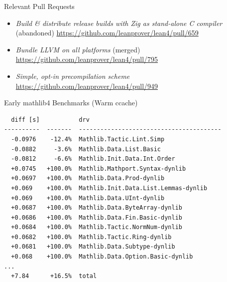 \documentclass[en,t,navbarkit]{sdqbeamer}
\begin{document}
\begin{frame}{Relevant Pull Requests}
  \begin{itemize}
    \item \emph{Build \& distribute release builds with Zig as stand-alone C compiler} (abandoned) \url{https://github.com/leanprover/lean4/pull/659}
    \item \emph{Bundle LLVM on all platforms} (merged)\\ \url{https://github.com/leanprover/lean4/pull/795}
    \item \emph{Simple, opt-in precompilation scheme}\\ \url{https://github.com/leanprover/lean4/pull/949}
  \end{itemize}
\end{frame}

\begin{frame}[fragile]{Early mathlib4 Benchmarks (Warm ccache)}
  \small
\begin{verbatim}
  diff [s]           drv
----------  -------  ----------------------------------------
  -0.0976    -12.4%  Mathlib.Tactic.Lint.Simp
  -0.0882     -3.6%  Mathlib.Data.List.Basic
  -0.0812     -6.6%  Mathlib.Init.Data.Int.Order
  +0.0745   +100.0%  Mathlib.Mathport.Syntax-dynlib
  +0.0697   +100.0%  Mathlib.Data.Prod-dynlib
  +0.069    +100.0%  Mathlib.Init.Data.List.Lemmas-dynlib
  +0.069    +100.0%  Mathlib.Data.UInt-dynlib
  +0.0687   +100.0%  Mathlib.Data.ByteArray-dynlib
  +0.0686   +100.0%  Mathlib.Data.Fin.Basic-dynlib
  +0.0684   +100.0%  Mathlib.Tactic.NormNum-dynlib
  +0.0682   +100.0%  Mathlib.Tactic.Ring-dynlib
  +0.0681   +100.0%  Mathlib.Data.Subtype-dynlib
  +0.068    +100.0%  Mathlib.Data.Option.Basic-dynlib
...
  +7.84      +16.5%  total
\end{verbatim}
\end{frame}
\end{document}
